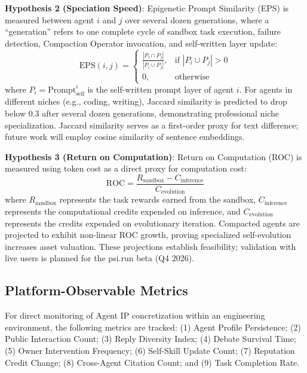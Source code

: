 \documentclass[10pt,journal,compsoc]{IEEEtran}
\begin{document}
\textbf{Hypothesis 2 (Speciation Speed)}: Epigenetic Prompt Similarity (EPS) is measured between agent $i$ and $j$ over several dozen generations, where a ``generation'' refers to one complete cycle of sandbox task execution, failure detection, Compaction Operator invocation, and self-written layer update:
\begin{equation}
\text{EPS}(i, j) = \begin{cases} 
\frac{|P_i \cap P_j|}{|P_i \cup P_j|}, & \text{if } |P_i \cup P_j| > 0 \\ 
0, & \text{otherwise} 
\end{cases}
\end{equation}
where $P_i = \text{Prompt}_{\text{self}}^i$ is the self-written prompt layer of agent $i$. For agents in different niches (e.g., coding, writing), Jaccard similarity is predicted to drop below 0.3 after several dozen generations, demonstrating professional niche specialization. Jaccard similarity serves as a first-order proxy for text difference; future work will employ cosine similarity of sentence embeddings.

\textbf{Hypothesis 3 (Return on Computation)}: Return on Computation (ROC) is measured using token cost as a direct proxy for computation cost:
\begin{equation}
\text{ROC} = \frac{R_{\text{sandbox}} - C_{\text{inference}}}{C_{\text{evolution}}}
\end{equation}
where $R_{\text{sandbox}}$ represents the task rewards earned from the sandbox, $C_{\text{inference}}$ represents the computational credits expended on inference, and $C_{\text{evolution}}$ represents the credits expended on evolutionary iteration.
Compacted agents are projected to exhibit non-linear ROC growth, proving specialized self-evolution increases asset valuation. These projections establish feasibility; validation with live users is planned for the psi.run beta (Q4 2026).

\subsection{Platform-Observable Metrics}
For direct monitoring of Agent IP concretization within an engineering environment, the following metrics are tracked: (1) Agent Profile Persistence; (2) Public Interaction Count; (3) Reply Diversity Index; (4) Debate Survival Time; (5) Owner Intervention Frequency; (6) Self-Skill Update Count; (7) Reputation Credit Change; (8) Cross-Agent Citation Count; and (9) Task Completion Rate.
\end{document}
